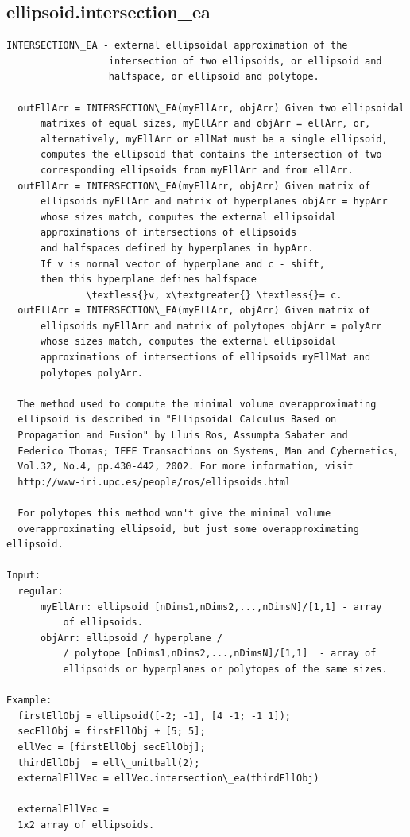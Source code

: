 \documentclass[letterpaper,10pt,english]{sphinxmanual}
\begin{document}
\subsection{ellipsoid.intersection\_ea}
\label{chap_functions:ellipsoid-intersection-ea}
\begin{Verbatim}[commandchars=\\\{\}]
INTERSECTION\_EA - external ellipsoidal approximation of the
                  intersection of two ellipsoids, or ellipsoid and
                  halfspace, or ellipsoid and polytope.

  outEllArr = INTERSECTION\_EA(myEllArr, objArr) Given two ellipsoidal
      matrixes of equal sizes, myEllArr and objArr = ellArr, or,
      alternatively, myEllArr or ellMat must be a single ellipsoid,
      computes the ellipsoid that contains the intersection of two
      corresponding ellipsoids from myEllArr and from ellArr.
  outEllArr = INTERSECTION\_EA(myEllArr, objArr) Given matrix of
      ellipsoids myEllArr and matrix of hyperplanes objArr = hypArr
      whose sizes match, computes the external ellipsoidal
      approximations of intersections of ellipsoids
      and halfspaces defined by hyperplanes in hypArr.
      If v is normal vector of hyperplane and c - shift,
      then this hyperplane defines halfspace
              \textless{}v, x\textgreater{} \textless{}= c.
  outEllArr = INTERSECTION\_EA(myEllArr, objArr) Given matrix of
      ellipsoids myEllArr and matrix of polytopes objArr = polyArr
      whose sizes match, computes the external ellipsoidal
      approximations of intersections of ellipsoids myEllMat and
      polytopes polyArr.

  The method used to compute the minimal volume overapproximating
  ellipsoid is described in "Ellipsoidal Calculus Based on
  Propagation and Fusion" by Lluis Ros, Assumpta Sabater and
  Federico Thomas; IEEE Transactions on Systems, Man and Cybernetics,
  Vol.32, No.4, pp.430-442, 2002. For more information, visit
  http://www-iri.upc.es/people/ros/ellipsoids.html

  For polytopes this method won't give the minimal volume
  overapproximating ellipsoid, but just some overapproximating ellipsoid.

Input:
  regular:
      myEllArr: ellipsoid [nDims1,nDims2,...,nDimsN]/[1,1] - array
          of ellipsoids.
      objArr: ellipsoid / hyperplane /
          / polytope [nDims1,nDims2,...,nDimsN]/[1,1]  - array of
          ellipsoids or hyperplanes or polytopes of the same sizes.

Example:
  firstEllObj = ellipsoid([-2; -1], [4 -1; -1 1]);
  secEllObj = firstEllObj + [5; 5];
  ellVec = [firstEllObj secEllObj];
  thirdEllObj  = ell\_unitball(2);
  externalEllVec = ellVec.intersection\_ea(thirdEllObj)

  externalEllVec =
  1x2 array of ellipsoids.
\end{Verbatim}
\end{document}
